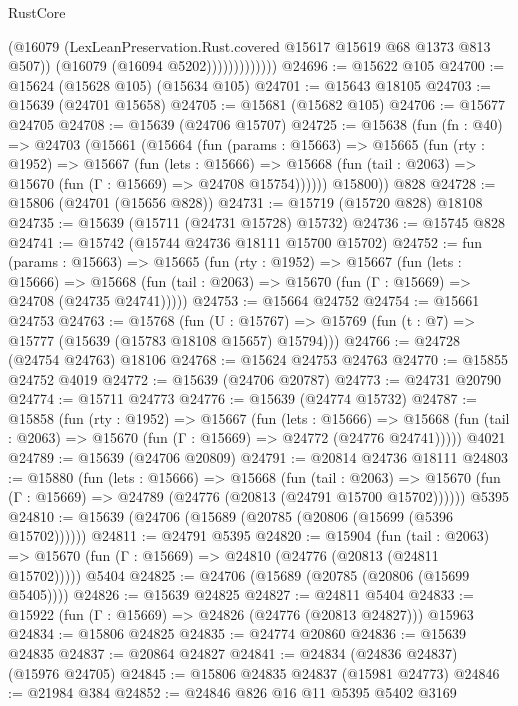 \begin{lexlean}{RustCore}
\begin{coremodule}
                          (@16079
                            (LexLeanPreservation.Rust.covered @15617 @15619 @68 @1373 @813 @507))
                          (@16079 (@16094 @5202)))))))))))))
@24696 := @15622 @105
@24700 := @15624 (@15628 @105) (@15634 @105)
@24701 := @15643 @18105
@24703 := @15639 (@24701 @15658)
@24705 := @15681 (@15682 @105)
@24706 := @15677 @24705
@24708 := @15639 (@24706 @15707)
@24725 := @15638
    (fun (fn : @40) =>
    @24703
      (@15661
        (@15664
          (fun (params : @15663) =>
          @15665
            (fun (rty : @1952) =>
            @15667
              (fun (lets : @15666) =>
              @15668 (fun (tail : @2063) => @15670 (fun (Γ : @15669) => @24708 @15754))))))
        @15800))
    @828
@24728 := @15806 (@24701 (@15656 @828))
@24731 := @15719 (@15720 @828) @18108
@24735 := @15639 (@15711 (@24731 @15728) @15732)
@24736 := @15745 @828
@24741 := @15742 (@15744 @24736 @18111 @15700 @15702)
@24752 := fun (params : @15663) =>
  @15665
    (fun (rty : @1952) =>
    @15667
      (fun (lets : @15666) =>
      @15668 (fun (tail : @2063) => @15670 (fun (Γ : @15669) => @24708 (@24735 @24741)))))
@24753 := @15664 @24752
@24754 := @15661 @24753
@24763 := @15768
    (fun (U : @15767) => @15769 (fun (t : @7) => @15777 (@15639 (@15783 @18108 @15657) @15794)))
@24766 := @24728 (@24754 @24763) @18106
@24768 := @15624 @24753 @24763
@24770 := @15855 @24752 @4019
@24772 := @15639 (@24706 @20787)
@24773 := @24731 @20790
@24774 := @15711 @24773
@24776 := @15639 (@24774 @15732)
@24787 := @15858
    (fun (rty : @1952) =>
    @15667
      (fun (lets : @15666) =>
      @15668 (fun (tail : @2063) => @15670 (fun (Γ : @15669) => @24772 (@24776 @24741)))))
    @4021
@24789 := @15639 (@24706 @20809)
@24791 := @20814 @24736 @18111
@24803 := @15880
    (fun (lets : @15666) =>
    @15668
      (fun (tail : @2063) =>
      @15670 (fun (Γ : @15669) => @24789 (@24776 (@20813 (@24791 @15700 @15702))))))
    @5395
@24810 := @15639 (@24706 (@15689 (@20785 (@20806 (@15699 (@5396 @15702))))))
@24811 := @24791 @5395
@24820 := @15904
    (fun (tail : @2063) => @15670 (fun (Γ : @15669) => @24810 (@24776 (@20813 (@24811 @15702)))))
    @5404
@24825 := @24706 (@15689 (@20785 (@20806 (@15699 @5405))))
@24826 := @15639 @24825
@24827 := @24811 @5404
@24833 := @15922 (fun (Γ : @15669) => @24826 (@24776 (@20813 @24827))) @15963
@24834 := @15806 @24825
@24835 := @24774 @20860
@24836 := @15639 @24835
@24837 := @20864 @24827
@24841 := @24834 (@24836 @24837) (@15976 @24705)
@24845 := @15806 @24835 @24837 (@15981 @24773)
@24846 := @21984 @384
@24852 := @24846 @826 @16 @11 @5395 @5402 @3169

\end{coremodule}
\end{lexlean}
